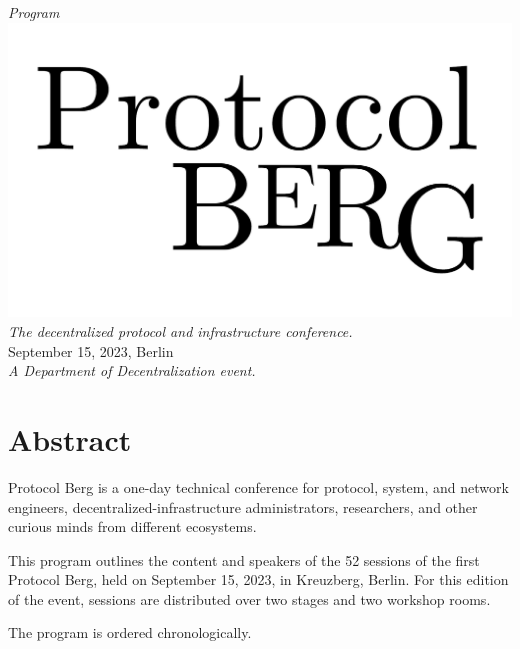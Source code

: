 \begin{titlepage}
  \begin{center}
    \textit{\huge Program}\\[1em]
    \includegraphics[width=\textwidth]{protocol.pdf}\\[1em]
    \textit{The decentralized protocol and infrastructure conference.}\\
    {September 15, 2023, Berlin}\\[1em]
    \vspace{\fill}
    \textit{\small A Department of Decentralization event.}
  \end{center}
\end{titlepage}

\pagestyle{fancy}

\cleardoublepage

\section*{Abstract}
Protocol Berg is a one-day technical conference for protocol, system, and network engineers,
decentralized-infrastructure administrators, researchers, and other curious minds from
different ecosystems.

This program outlines the content and speakers of the 52 sessions of the first Protocol Berg,
held on September 15, 2023, in Kreuzberg, Berlin. For this edition of the event, sessions
are distributed over two stages and two workshop rooms.

The program is ordered chronologically.

\cleardoublepage

\tableofcontents

\cleardoublepage
